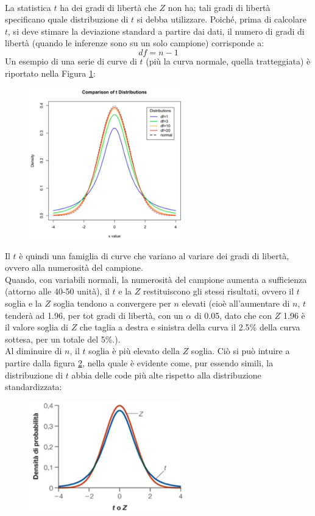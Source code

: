 \documentclass[10pt, draft]{book}
\begin{document}
\\
La statistica $t$ ha dei gradi di libertà che $Z$ non ha; tali gradi di libertà specificano quale distribuzione di $t$ si debba utilizzare. Poiché, prima di calcolare $t$, si deve stimare la deviazione standard a partire dai dati, il numero di gradi di libertà (quando le inferenze sono su un solo campione) corrisponde a:
\begin{equation}
    df = n-1
\end{equation}
Un esempio di una serie di curve di $t$ (più la curva normale, quella tratteggiata) è riportato nella Figura \ref{figdistribuzionit}:
\begin{figure}[H]\label{figdistribuzionit}
    \centering
    \includegraphics[width=0.6\textwidth]{figdistribuzionit}
    \caption{\small{}}
    \end{figure}
Il $t$ è quindi una famiglia di curve che variano al variare dei gradi di libertà, ovvero alla numerosità del campione.
\\
Quando, con variabili normali, la numerosità del campione aumenta a sufficienza (attorno alle 40-50 unità), il $t$ e la $Z$ restituiscono gli stessi risultati, ovvero il $t$ soglia e la $Z$ soglia tendono a convergere per $n$ elevati (cioè all'aumentare di $n$, $t$ tenderà ad 1.96, per tot gradi di libertà, con un $\alpha$ di 0.05, dato che con $Z$ 1.96 è il valore soglia di $Z$ che taglia a destra e sinistra della curva il 2.5\% della curva sottesa, per un totale del 5\%.).
\\
Al diminuire di $n$, il $t$ soglia è più elevato della $Z$ soglia. Ciò si può intuire a partire dalla figura \ref{fig11.1-1}, nella quale è evidente come, pur essendo simili, la distribuzione di $t$ abbia delle code più alte rispetto alla distribuzione standardizzata:
\begin{figure}[H]\label{fig11.1-1}
    \centering
    \includegraphics[width=0.6\textwidth]{fig11.1-1}
    \caption{\small{}}
    \end{figure}
\end{document}
